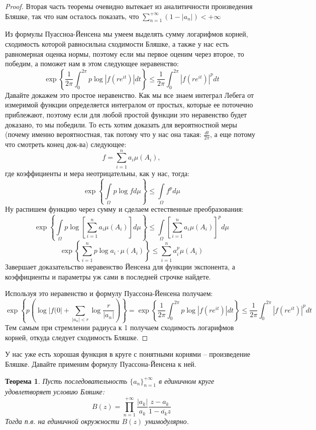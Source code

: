 \documentclass[12pt,a4paper]{article} %
\newtheorem{theorem}{Теорема}
\begin{document}
	\begin{proof}
		Вторая часть теоремы очевидно вытекает из аналитичности произведения Бляшке, так что нам осталось показать, что $\displaystyle\sum_{n=1}^{+\infty}(1-|a_n|)<+\infty$
		
		Из формулы Пуассноа-Йенсена мы умеем выделять сумму логарифмов корней, сходимость которой равносильна сходимости Бляшке, а также у нас есть равномерная оценка нормы, поэтому если мы первое оценим через второе, то победим, а поможет нам в этом следующее неравенство:
		$$\exp\left\{\frac{1}{2\pi}\int_0^{2\pi}p\log|f(re^{it})|dt\right\}\leq\frac{1}{2\pi}\int_0^{2\pi}|f(re^{it})|^pdt$$
		Давайте докажем это простое неравенство. Как мы все знаем интеграл Лебега от измеримой функции определяется интегралом от простых, которые ее поточечно приблежают, поэтому если для любой простой функции это неравенство будет доказано, то мы победили. То есть хотим доказать для вероятностной меры (почему именно вероятностная, так потому что у нас она такая: $\frac{dt}{2\pi}$, а еще потому что смотреть конец док-ва) следующее:
		$$f=\sum_{i=1}^na_i\mu(A_i),$$
		где коэффициенты и мера неотрицательны, как у нас, тогда:
		$$\exp\left\{\int\limits_{\Omega}p\log fd\mu\right\}\leq\int\limits_{\Omega}f^pd\mu$$
		Ну распишем функцию через сумму и сделаем естественные преобразования:
		$$\exp\left\{\int\limits_{\Omega}p\log\left[\sum_{i=1}^na_i\mu(A_i)\right]d\mu\right\}\leq\int\limits_{\Omega}\left[\sum_{i=1}^na_i\mu(A_i)\right]^pd\mu$$
		$$\exp\left\{\sum_{i=1}^np\log a_i\cdot\mu(A_i)\right\}\leq\sum_{i=1}^na_i^p\mu(A_i)$$
		Завершает доказательство неравенство Йенсена для функции экспонента, а коэффициенты и параметры уж сами в последней строчке найдете.
		
		Используя это неравенство и формулу Пуассона-Йенсена получаем:
		$$\exp\left\{p\left(\log|f(0|+\sum\limits_{|a_n|<r}\log\frac{r}{|a_n|}\right)\right\}=\exp\left\{\frac{1}{2\pi}\int_0^{2\pi}p\log|f(re^{it})|dt\right\}\leq\frac{1}{2\pi}\int_0^{2\pi}|f(re^{it})|^pdt$$
		Тем самым при стремлении радиуса к 1 получаем сходимость логарифмов корней, откуда следует сходимость Бляшке.
	\end{proof}
	У нас уже есть хорошая функция в круге с понятными корнями -- произведение Бляшке. Давайте применим формулу Пуассона-Йенсена к ней.
	\begin{theorem}
		Пусть последовательность $\{a_n\}_{n=1}^{+\infty}$ в единичном круге удовлетворяет условию Бляшке:
		$$B(z)=\prod_{n=1}^{+\infty}\frac{|a_k|}{a_k}\frac{z-a_k}{1-\overline{a_k}z}$$
		Тогда п.в. на единичной окружности $B(z)$ унимодулярно.
	\end{theorem}
\end{document}
